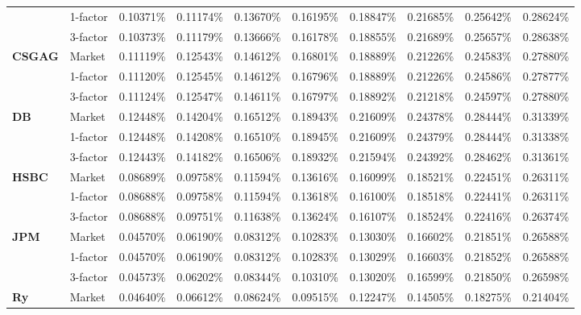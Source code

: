 \documentclass[12pt,a4paper]{article}
\theoremstyle{plain}
\numberwithin{equation}{section}
\begin{document}
\begin{table}[t]
{\begin{tabular}{|rl|cccccccc|}
\cmidrule{3-10}          & 1-factor & 0.10371\% & 0.11174\% & 0.13670\% & 0.16195\% & 0.18847\% & 0.21685\% & 0.25642\% & 0.28624\% \\
          & 3-factor & 0.10373\% & 0.11179\% & 0.13666\% & 0.16178\% & 0.18855\% & 0.21689\% & 0.25657\% & 0.28638\% \\
    \midrule
    \midrule
    \multicolumn{1}{|l}{\textbf{CSGAG}} & Market & 0.11119\% & 0.12543\% & 0.14612\% & 0.16801\% & 0.18889\% & 0.21226\% & 0.24583\% & 0.27880\% \\
\cmidrule{3-10}          & 1-factor & 0.11120\% & 0.12545\% & 0.14612\% & 0.16796\% & 0.18889\% & 0.21226\% & 0.24586\% & 0.27877\% \\
          & 3-factor & 0.11124\% & 0.12547\% & 0.14611\% & 0.16797\% & 0.18892\% & 0.21218\% & 0.24597\% & 0.27880\% \\
    \midrule
    \midrule
    \multicolumn{1}{|l}{\textbf{DB}} & Market & 0.12448\% & 0.14204\% & 0.16512\% & 0.18943\% & 0.21609\% & 0.24378\% & 0.28444\% & 0.31339\% \\
\cmidrule{3-10}          & 1-factor & 0.12448\% & 0.14208\% & 0.16510\% & 0.18945\% & 0.21609\% & 0.24379\% & 0.28444\% & 0.31338\% \\
          & 3-factor & 0.12443\% & 0.14182\% & 0.16506\% & 0.18932\% & 0.21594\% & 0.24392\% & 0.28462\% & 0.31361\% \\
    \midrule
    \midrule
    \multicolumn{1}{|l}{\textbf{HSBC}} & Market & 0.08689\% & 0.09758\% & 0.11594\% & 0.13616\% & 0.16099\% & 0.18521\% & 0.22451\% & 0.26311\% \\
\cmidrule{3-10}          & 1-factor & 0.08688\% & 0.09758\% & 0.11594\% & 0.13618\% & 0.16100\% & 0.18518\% & 0.22441\% & 0.26311\% \\
          & 3-factor & 0.08688\% & 0.09751\% & 0.11638\% & 0.13624\% & 0.16107\% & 0.18524\% & 0.22416\% & 0.26374\% \\
    \midrule
    \midrule
    \multicolumn{1}{|l}{\textbf{JPM}} & Market & 0.04570\% & 0.06190\% & 0.08312\% & 0.10283\% & 0.13030\% & 0.16602\% & 0.21851\% & 0.26588\% \\
\cmidrule{3-10}          & 1-factor & 0.04570\% & 0.06190\% & 0.08312\% & 0.10283\% & 0.13029\% & 0.16603\% & 0.21852\% & 0.26588\% \\
          & 3-factor & 0.04573\% & 0.06202\% & 0.08344\% & 0.10310\% & 0.13020\% & 0.16599\% & 0.21850\% & 0.26598\% \\
    \midrule
    \midrule
    \multicolumn{1}{|l}{\textbf{Ry}} & Market & 0.04640\% & 0.06612\% & 0.08624\% & 0.09515\% & 0.12247\% & 0.14505\% & 0.18275\% & 0.21404\% \\

\end{tabular}}
\end{table}
\end{document}
